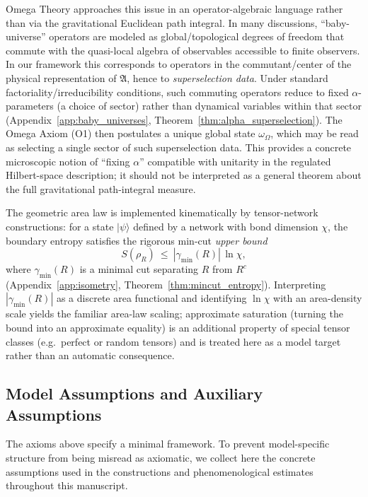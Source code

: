 Omega Theory approaches this issue in an operator-algebraic language rather than via the gravitational Euclidean path integral. In many discussions, ``baby-universe'' operators are modeled as global/topological degrees of freedom that commute with the quasi-local algebra of observables accessible to finite observers. In our framework this corresponds to operators in the commutant/center of the physical representation of $\mathfrak{A}$, hence to \emph{superselection data}. Under standard factoriality/irreducibility conditions, such commuting operators reduce to fixed $\alpha$-parameters (a choice of sector) rather than dynamical variables within that sector (Appendix~\ref{app:baby_universes}, Theorem~\ref{thm:alpha_superselection}). The Omega Axiom (O1) then postulates a unique global state $\omega_\Omega$, which may be read as selecting a single sector of such superselection data. This provides a concrete microscopic notion of ``fixing $\alpha$'' compatible with unitarity in the regulated Hilbert-space description; it should not be interpreted as a general theorem about the full gravitational path-integral measure.

The geometric area law is implemented kinematically by tensor-network constructions: for a state $|\psi\rangle$ defined by a network with bond dimension $\chi$, the boundary entropy satisfies the rigorous min-cut \emph{upper bound}
\begin{equation}
    S(\rho_R)\ \le\ |\gamma_{\min}(R)|\,\ln\chi,
\end{equation}
where $\gamma_{\min}(R)$ is a minimal cut separating $R$ from $R^c$ (Appendix~\ref{app:isometry}, Theorem~\ref{thm:mincut_entropy}). Interpreting $|\gamma_{\min}(R)|$ as a discrete area functional and identifying $\ln\chi$ with an area-density scale yields the familiar area-law scaling; approximate saturation (turning the bound into an approximate equality) is an additional property of special tensor classes (e.g.\ perfect or random tensors) and is treated here as a model target rather than an automatic consequence.

\subsection{Model Assumptions and Auxiliary Assumptions}
\label{sec:model_assumptions}
The axioms above specify a minimal framework. To prevent model-specific structure from being misread as axiomatic, we collect here the concrete assumptions used in the constructions and phenomenological estimates throughout this manuscript.

